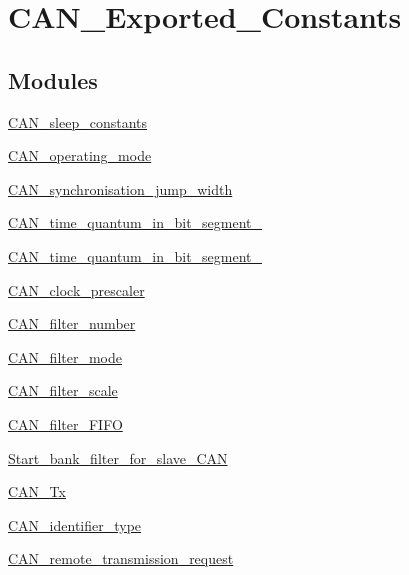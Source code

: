 \hypertarget{group___c_a_n___exported___constants}{\section{C\-A\-N\-\_\-\-Exported\-\_\-\-Constants}
\label{group___c_a_n___exported___constants}
}
\subsection*{Modules}
\begin{DoxyCompactItemize}
\item 
\hyperlink{group___c_a_n__sleep__constants}{C\-A\-N\-\_\-sleep\-\_\-constants}
\item 
\hyperlink{group___c_a_n__operating__mode}{C\-A\-N\-\_\-operating\-\_\-mode}
\item 
\hyperlink{group___c_a_n__synchronisation__jump__width}{C\-A\-N\-\_\-synchronisation\-\_\-jump\-\_\-width}
\item 
\hyperlink{group___c_a_n__time__quantum__in__bit__segment__1}{C\-A\-N\-\_\-time\-\_\-quantum\-\_\-in\-\_\-bit\-\_\-segment\-\_}
\item 
\hyperlink{group___c_a_n__time__quantum__in__bit__segment__2}{C\-A\-N\-\_\-time\-\_\-quantum\-\_\-in\-\_\-bit\-\_\-segment\-\_}
\item 
\hyperlink{group___c_a_n__clock__prescaler}{C\-A\-N\-\_\-clock\-\_\-prescaler}
\item 
\hyperlink{group___c_a_n__filter__number}{C\-A\-N\-\_\-filter\-\_\-number}
\item 
\hyperlink{group___c_a_n__filter__mode}{C\-A\-N\-\_\-filter\-\_\-mode}
\item 
\hyperlink{group___c_a_n__filter__scale}{C\-A\-N\-\_\-filter\-\_\-scale}
\item 
\hyperlink{group___c_a_n__filter___f_i_f_o}{C\-A\-N\-\_\-filter\-\_\-\-F\-I\-F\-O}
\item 
\hyperlink{group___start__bank__filter__for__slave___c_a_n}{Start\-\_\-bank\-\_\-filter\-\_\-for\-\_\-slave\-\_\-\-C\-A\-N}
\item 
\hyperlink{group___c_a_n___tx}{C\-A\-N\-\_\-\-Tx}
\item 
\hyperlink{group___c_a_n__identifier__type}{C\-A\-N\-\_\-identifier\-\_\-type}
\item 
\hyperlink{group___c_a_n__remote__transmission__request}{C\-A\-N\-\_\-remote\-\_\-transmission\-\_\-request}
\item 

\end{DoxyCompactItemize}
